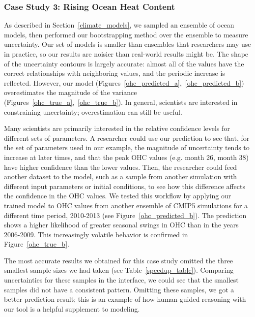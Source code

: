 \subsubsection{Case Study 3: Rising Ocean Heat Content}
As described in Section~\ref{climate_models}, we sampled an ensemble of ocean models, then performed our bootstrapping method over the ensemble to measure uncertainty. Our set of models is smaller than ensembles that researchers may use in practice, so our results are noisier than real-world results might be. The shape of the uncertainty contours is largely accurate: almost all of the values have the correct relationships with neighboring values, and the periodic increase is reflected. However, our model (Figures~\ref{ohc_predicted_a},~\ref{ohc_predicted_b}) overestimates the magnitude of the variance (Figures~\ref{ohc_true_a},~\ref{ohc_true_b}). In general, scientists are interested in constraining uncertainty; overestimation can still be useful. 

Many scientists are primarily interested in the relative confidence levels for different sets of parameters. A researcher could use our prediction to see that, for the set of parameters used in our example, the magnitude of uncertainty tends to increase at later times, and that the peak OHC values (e.g. month 26, month 38) have higher confidence than the lower values. Then, the researcher could feed another dataset to the model, such as a sample from another simulation with different input parameters or initial conditions, to see how this difference affects the confidence in the OHC values. We tested this workflow by applying our trained model to OHC values from another ensemble of CMIP5 simulations for a different time period, 2010-2013 (see Figure~\ref{ohc_predicted_b}). The prediction shows a higher likelihood of greater seasonal swings in OHC than in the years 2006-2009. This increasingly volatile behavior is confirmed in Figure~\ref{ohc_true_b}.
	
The most accurate results we obtained for this case study omitted the three smallest sample sizes we had taken (see Table~\ref{speedup_table}). Comparing uncertainties for these samples in the interface, we could see that the smallest samples did not have a consistent pattern. Omitting these samples, we got a better prediction result; this is an example of how human-guided reasoning with our tool is a helpful supplement to modeling.



